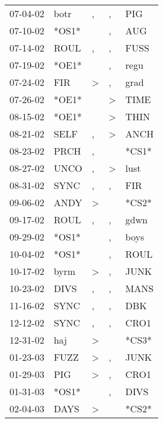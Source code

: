 \begin{supertabular}{lllll}
 07-04-02 &   botr &                , &                , &    PIG \\
 07-10-02 &  *OS1* &                  &                , &    AUG \\
 07-14-02 &   ROUL &                , &                , &   FUSS \\
 07-19-02 &  *OE1* &                  &                , &   regu \\
 07-24-02 &    FIR &     \textgreater &                , &   grad \\
 07-26-02 &  *OE1* &                  &     \textgreater &   TIME \\
 08-15-02 &  *OE1* &                  &     \textgreater &   THIN \\
 08-21-02 &   SELF &                , &     \textgreater &   ANCH \\
 08-23-02 &   PRCH &                , &                  &  *CS1* \\
 08-27-02 &   UNCO &                , &     \textgreater &   lust \\
 08-31-02 &   SYNC &                , &                , &    FIR \\
 09-06-02 &   ANDY &     \textgreater &                  &  *CS2* \\
 09-17-02 &   ROUL &                , &                , &   gdwn \\
 09-29-02 &  *OS1* &                  &                , &   boys \\
 10-04-02 &  *OS1* &                  &                , &   ROUL \\
 10-17-02 &   byrm &     \textgreater &                , &   JUNK \\
 10-23-02 &   DIVS &                , &                , &   MANS \\
 11-16-02 &   SYNC &                , &                , &    DBK \\
 12-12-02 &   SYNC &                , &                , &   CRO1 \\
 12-31-02 &    haj &     \textgreater &                  &  *CS3* \\
 01-23-03 &   FUZZ &     \textgreater &                , &   JUNK \\
 01-29-03 &    PIG &     \textgreater &                , &   CRO1 \\
 01-31-03 &  *OS1* &                  &                , &   DIVS \\
 02-04-03 &   DAYS &     \textgreater &                  &  *CS2* \\

\end{supertabular}
